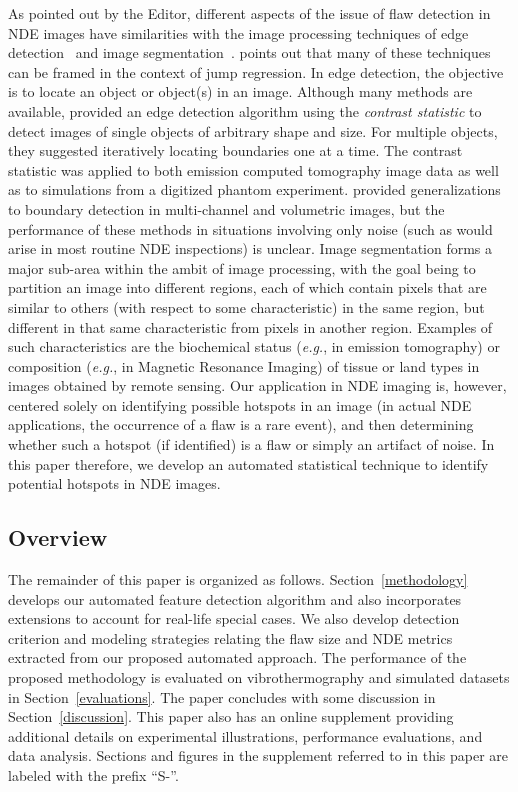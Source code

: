 \documentclass[12pt]{article}
\begin{document}
As pointed out by the Editor, different aspects of the
issue of flaw detection in NDE images have similarities with the image
processing techniques of edge
detection~\citep{marrandhildreth80,rosenfeld84,bergholm87,
  gauchandpizer93,osullivanandqian94} and image
segmentation~\citep{rosenfeldandkak82-2,qiuandsun07,qiuandsun09}.
\citet{qiu05} points out that many of these techniques can be framed
in the context of jump regression. In edge detection, the objective is
to locate an object or object(s) in an image. Although many methods
are available, \citet{osullivanandqian94} provided an edge detection
algorithm using the {\em contrast statistic} to detect images of
single objects of arbitrary shape and size. For multiple objects, they
suggested iteratively locating boundaries one at a time. The contrast
statistic was applied to both emission computed tomography image data
as well as to simulations from a digitized phantom
experiment. \citet{osullivanandqian94} provided generalizations to
boundary detection in multi-channel and volumetric images, but the
performance of these methods in situations involving only noise (such
as would arise in most routine NDE inspections) is unclear. Image
segmentation forms a major sub-area within the ambit of image
processing, with the goal being to partition an image into 
different regions, each of which contain pixels that are similar to
others (with respect to some characteristic) in the same region, but
different in that same characteristic from pixels in another
region. Examples of such characteristics are the biochemical status
({\em e.g.}, in emission tomography) or composition ({\em e.g.}, in  Magnetic
  Resonance Imaging) of tissue or land types in images obtained  
by remote sensing. Our application in NDE imaging is, however,
centered solely on identifying possible hotspots in an image (in
actual NDE applications, the occurrence of a flaw is a rare event), 
and then determining  whether such a hotspot (if identified) is a
flaw or simply an artifact of noise. In this paper therefore, we develop an
automated statistical technique to identify potential hotspots in NDE
images. 


 \subsection{Overview}

 The remainder of this paper is organized as
 follows. Section~\ref{methodology} develops our automated feature 
 detection algorithm and also incorporates extensions to account for 
 real-life special cases. We also develop  detection criterion and
 modeling strategies  relating the flaw size and NDE metrics extracted
 from our proposed automated approach. The performance of the
 proposed methodology is evaluated on vibrothermography and simulated
 datasets in Section~\ref{evaluations}. The paper concludes with some
 discussion in Section~\ref{discussion}. This paper also has an online
 supplement providing additional details on experimental
 illustrations, performance evaluations, and data analysis.  Sections
 and figures in the supplement referred to in this paper are labeled with
 the prefix ``S-''.  
\end{document}
